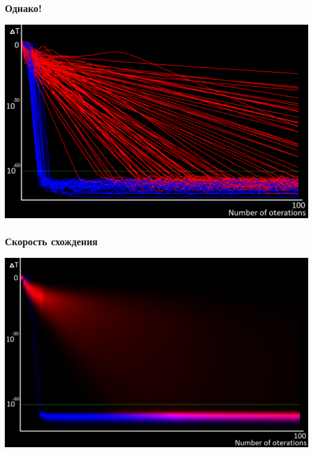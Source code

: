 \documentclass{beamer}
\begin{document}

\begin{frame}
	\frametitle{Однако!}
	
	\centerline{\includegraphics[scale=0.35]{lines.png}}
	
\end{frame}


\begin{frame}
	\frametitle{Скорость схождения}
	
	\centerline{\includegraphics[scale=0.33]{distributions_all.png}}
	
\end{frame}

\end{document}
